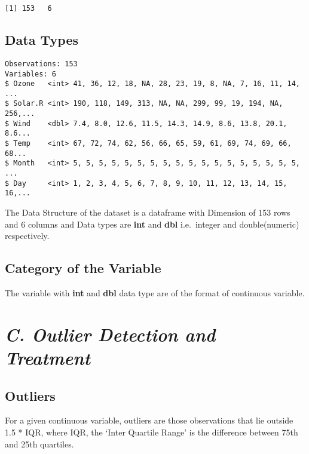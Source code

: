 \documentclass[12pt,]{article}
\begin{document}
\begin{verbatim}
[1] 153   6
\end{verbatim}

\subsection{\texorpdfstring{\textbf{Data
Types}}{Data Types}}\label{data-types}

\begin{verbatim}
Observations: 153
Variables: 6
$ Ozone   <int> 41, 36, 12, 18, NA, 28, 23, 19, 8, NA, 7, 16, 11, 14, ...
$ Solar.R <int> 190, 118, 149, 313, NA, NA, 299, 99, 19, 194, NA, 256,...
$ Wind    <dbl> 7.4, 8.0, 12.6, 11.5, 14.3, 14.9, 8.6, 13.8, 20.1, 8.6...
$ Temp    <int> 67, 72, 74, 62, 56, 66, 65, 59, 61, 69, 74, 69, 66, 68...
$ Month   <int> 5, 5, 5, 5, 5, 5, 5, 5, 5, 5, 5, 5, 5, 5, 5, 5, 5, 5, ...
$ Day     <int> 1, 2, 3, 4, 5, 6, 7, 8, 9, 10, 11, 12, 13, 14, 15, 16,...
\end{verbatim}

The Data Structure of the dataset is a dataframe with Dimension of 153
rows and 6 columns and Data types are \textbf{int} and \textbf{dbl}
i.e.~integer and double(numeric) respectively.

\subsection{\texorpdfstring{\textbf{Category of the
Variable}}{Category of the Variable}}\label{category-of-the-variable}

The variable with \textbf{int} and \textbf{dbl} data type are of the
format of continuous variable.

\section{\texorpdfstring{\emph{C. Outlier Detection and
Treatment}}{C. Outlier Detection and Treatment}}\label{c.-outlier-detection-and-treatment}

\subsection{\texorpdfstring{\textbf{Outliers}}{Outliers}}\label{outliers}

For a given continuous variable, outliers are those observations that
lie outside 1.5 * IQR, where IQR, the `Inter Quartile Range' is the
difference between 75th and 25th quartiles.
\end{document}
